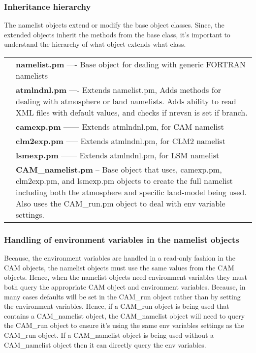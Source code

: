 \documentclass[]{article}
\begin{document}
\subsubsection{Inheritance hierarchy}
The namelist objects extend or modify the base object classes. Since, the extended
objects inherit the methods from the base class, it's important to understand the
hierarchy of what object extends what class.\\
\begin{tabular}{r p{3.7in}}
             & {\bf namelist.pm} ---- Base object for dealing with generic FORTRAN namelists \\
             & {\bf atmlndnl.pm} ---- Extends namelist.pm, Adds methods for dealing with
                                atmosphere or land namelists. Adds
                                ability to read XML files with default
                                values, and checks if nrevsn is set if 
                                branch.\\
             & {\bf camexp.pm} ------ Extends atmlndnl.pm, for CAM namelist \\
             & {\bf clm2exp.pm} ----- Extends atmlndnl.pm, for CLM2 namelist
\\
             & {\bf lsmexp.pm} ------ Extends atmlndnl.pm, for LSM namelist
\\
             & {\bf CAM\_namelist.pm} -- Base object that uses, camexp.pm, clm2exp.pm, and
                                  lsmexp.pm objects to create the full 
                                  namelist including both the
                                  atmosphere and specific land-model being used. Also
				      uses the CAM\_run.pm object to deal with env variable
			             settings.
\end{tabular}
\subsubsection{Handling of environment variables in the namelist objects}

Because, the environment variables are handled in a read-only fashion in the CAM
objects, the namelist objects must use the same values from the CAM objects. Hence, when
the namelist objects need environment variables they must both query the appropriate
CAM object and environment variables. Because, in many cases defaults will be set in
the CAM\_run object rather than by setting the environment variables. Hence, if a
CAM\_run object is being used that contains a CAM\_namelist object, the CAM\_namelist 
object will need to query the CAM\_run object to ensure it's using the same env variables
settings as the CAM\_run object. If a CAM\_namelist object is being used without a
CAM\_namelist object then it can directly query the env variables.
\end{document}
